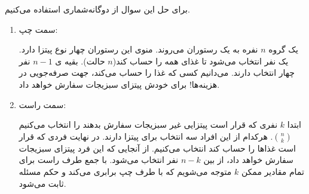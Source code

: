 \p
برای حل این سوال از دوگانه‌شماری استفاده می‌کنیم.

\begin{enumerate}
    \item 
    سمت چپ: 

\p
یک گروه $n$ نفره به یک رستوران می‌روند. منوی این رستوران چهار نوع پیتزا دارد.  یک نفر انتخاب می‌شود تا غذای همه را حساب کند($n$ حالت). بقیه ی $n-1$ نفر چهار انتخاب دارند. می‌دانیم کسی که غذا را حساب می‌کند، جهت صرفه‌جویی در هزینه‌ها! برای خودش پیتزای سبزیجات سفارش خواهد داد.

\item 
سمت راست:

\p
ابتدا $k$ نفری که قرار است پیتزایی غیر سبزیجات سفارش بدهند را انتخاب می‌کنیم 
$\binom{n}{k}$.
هرکدام از این افراد سه انتخاب برای پیتزا دارند. در نهایت فردی که قرار است غذاها را حساب کند انتخاب می‌کنیم. از آنجایی که این فرد پیتزای سبزیجات سفارش خواهد داد، از بین $n-k$ نفر انتخاب می‌شود. با جمع طرف راست برای تمام مقادیر ممکن $k$ متوجه می‌شویم که با طرف چپ برابری می‌کند و حکم مسئله ثابت می‌شود.
\end{enumerate}

